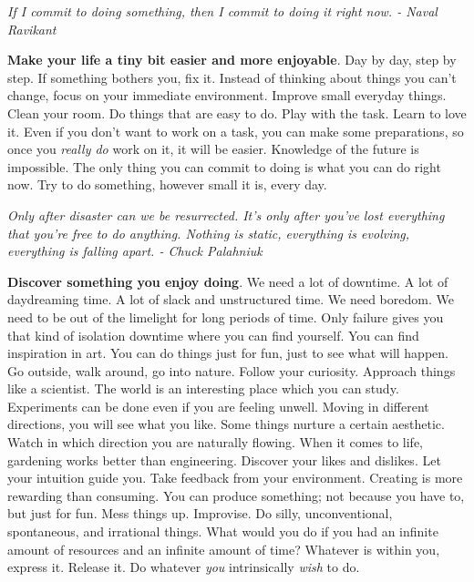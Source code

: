 \documentclass[a4paper,hidelinks]{article}
\begin{document}
\newpage

\begin{center}
\textit{
If I commit to doing something, then I commit to doing it right now. - Naval Ravikant
}
\end{center}

\textbf{Make your life a tiny bit easier and more enjoyable}.
Day by day, step by step.
If something bothers you, fix it.
Instead of thinking about things you can't change, focus on your immediate environment.
Improve small everyday things.
Clean your room.
Do things that are easy to do.
Play with the task.
Learn to love it.
Even if you don't want to work on a task, you can make some preparations, so once you \textit{really do} work on it, it will be easier.
Knowledge of the future is impossible.
The only thing you can commit to doing is what you can do right now.
Try to do something, however small it is, every day.

\newpage

\begin{center}
\textit{
Only after disaster can we be resurrected. It's only after you've lost everything that you're free to do anything. Nothing is static, everything is evolving, everything is falling apart. - Chuck Palahniuk
}
\end{center}

\textbf{Discover something you enjoy doing}.
We need a lot of downtime.
A lot of daydreaming time.
A lot of slack and unstructured time.
We need boredom.
We need to be out of the limelight for long periods of time.
Only failure gives you that kind of isolation downtime where you can find yourself.
You can find inspiration in art.
You can do things just for fun, just to see what will happen.
Go outside, walk around, go into nature.
Follow your curiosity.
Approach things like a scientist.
The world is an interesting place which you can study.
Experiments can be done even if you are feeling unwell.
Moving in different directions, you will see what you like.
Some things nurture a certain aesthetic.
Watch in which direction you are naturally flowing.
When it comes to life, gardening works better than engineering.
Discover your likes and dislikes.
Let your intuition guide you.
Take feedback from your environment.
Creating is more rewarding than consuming.
You can produce something; not because you have to, but just for fun.
Mess things up.
Improvise.
Do silly, unconventional, spontaneous, and irrational things.
What would you do if you had an infinite amount of resources and an infinite amount of time?
Whatever is within you, express it.
Release it.
Do whatever \textit{you} intrinsically \textit{wish} to do.
\end{document}
